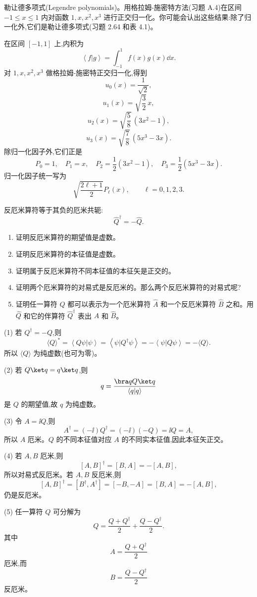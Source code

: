 \begin{question}
勒让德多项式(Legendre polynomials)。用格拉姆-施密特方法(习题 A.4)在区间 $-1\leq x\leq 1$ 内对函数 $1,x,x^2,x^3$ 进行正交归一化。你可能会认出这些结果:除了归一化外,它们是勒让德多项式(习题 2.64 和表 4.1)。
\begin{solution}
在区间 $[-1,1]$ 上,内积为
\[
\left\langle f|g \right\rangle=\int_{-1}^{1}f(x)g(x)\dd x.
\]
对 $1,x,x^2,x^3$ 做格拉姆-施密特正交归一化,得到
\[
u_0(x)=\frac1{\sqrt2},
\]
\[
u_1(x)=\sqrt{\frac32}\,x,
\]
\[
u_2(x)=\sqrt{\frac58}\,(3x^2-1),
\]
\[
u_3(x)=\sqrt{\frac78}\,(5x^3-3x).
\]
除归一化因子外,它们正是
\[
P_0=1,
\quad P_1=x,
\quad P_2=\frac12(3x^2-1),
\quad P_3=\frac12(5x^3-3x).
\]
归一化因子统一写为
\[
\sqrt{\frac{2\ell+1}{2}}P_\ell(x),
\qquad \ell=0,1,2,3.
\]
\end{solution}
\end{question}

\begin{question}
反厄米算符等于其负的厄米共轭:
\[
\hat Q^\dagger=-\hat Q.\tag{3.111}
\]
\begin{enumerate}
\item 证明反厄米算符的期望值是虚数。
\item 证明反厄米算符的本征值是虚数。
\item 证明属于反厄米算符不同本征值的本征矢是正交的。
\item 证明两个厄米算符的对易式是反厄米的。那么两个反厄米算符的对易式呢?
\item 证明任一算符 $\hat Q$ 都可以表示为一个厄米算符 $\hat A$ 和一个反厄米算符 $\hat B$ 之和。用 $\hat Q$ 和它的伴算符 $\hat Q^\dagger$ 表出 $\hat A$ 和 $\hat B$。
\end{enumerate}
\begin{solution}
(1) 若 $Q^\dagger=-Q$,则
\[
\langle Q\rangle^*=\left\langle Q\psi|\psi \right\rangle=\left\langle \psi|Q^\dagger\psi \right\rangle=-\left\langle \psi|Q\psi \right\rangle=-\langle Q\rangle.
\]
所以 $\langle Q\rangle$ 为纯虚数(也可为零)。

(2) 若 $Q\ket q=q\ket q$,则
\[
q=\frac{\bra qQ\ket q}{\left\langle q|q \right\rangle}
\]
是 $Q$ 的期望值,故 $q$ 为纯虚数。

(3) 令 $A=\ii Q$,则
\[
A^\dagger=(-\ii)Q^\dagger=(-\ii)(-Q)=\ii Q=A,
\]
所以 $A$ 厄米。$Q$ 的不同本征值对应 $A$ 的不同实本征值,因此本征矢正交。

(4) 若 $A,B$ 厄米,则
\[
[A,B]^\dagger=[B,A]=-[A,B],
\]
所以对易式反厄米。若 $A,B$ 反厄米,则
\[
[A,B]^\dagger=[B^\dagger,A^\dagger]=[-B,-A]=[B,A]=-[A,B],
\]
仍是反厄米。

(5) 任一算符 $Q$ 可分解为
\[
Q=\frac{Q+Q^\dagger}{2}+\frac{Q-Q^\dagger}{2}.
\]
其中
\[
\boxed{A=\frac{Q+Q^\dagger}{2}}
\]
厄米,而
\[
\boxed{B=\frac{Q-Q^\dagger}{2}}
\]
反厄米。
\end{solution}
\end{question}

